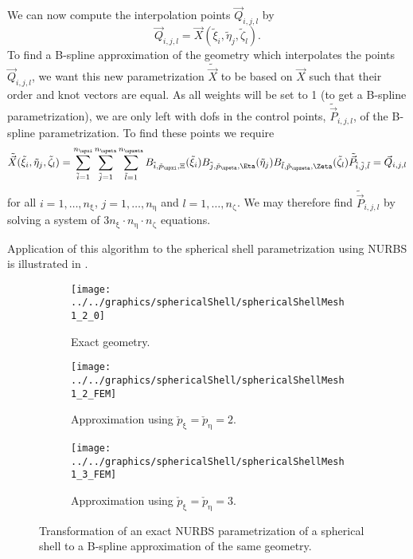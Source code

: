 We can now compute the interpolation points $\vec{Q}_{i,j,l}$ by
\begin{equation}
	\vec{Q}_{i,j,l} = \vec{X}(\tilde{\xi}_i,\tilde{\eta}_j,\tilde{\zeta}_l).
\end{equation}
To find a B-spline approximation of the geometry which interpolates the points $\vec{Q}_{i,j,l}$, we want this new parametrization $\tilde{\vec{X}}$ to be based on $\vec{X}$ such that their order and knot vectors are equal. As all weights will be set to 1 (to get a B-spline parametrization), we are only left with dofs in the control points, $\tilde{\vec{P}}_{i,j,l}$, of the B-spline parametrization. To find these points we require
\begin{equation}
	\tilde{\vec{X}}(\tilde{\xi}_i,\tilde{\eta}_j,\tilde{\zeta}_l) = \sum_{\tilde{i}=1}^{n_\upxi}\sum_{\tilde{j}=1}^{n_\upeta}\sum_{\tilde{l}=1}^{n_\upzeta} B_{\tilde{i},\check{p}_\upxi,\Xi}(\tilde{\xi}_i)B_{\tilde{j},\check{p}_\upeta,\Eta}(\tilde{\eta}_j)B_{\tilde{l},\check{p}_\upzeta,\Zeta}(\tilde{\zeta}_l)\tilde{\vec{P}}_{\tilde{i},\tilde{j},\tilde{l}} = \vec{Q}_{i,j,l}
\end{equation}
for all $i=1,\dots,n_\upxi$, $j=1,\dots,n_\upeta$ and $l=1,\dots,n_\upzeta$. We may therefore find $\tilde{\vec{P}}_{i,j,l}$ by solving a system of $3n_\upxi\cdot n_\upeta\cdot n_\upzeta$ equations.

Application of this algorithm to the spherical shell parametrization using NURBS is illustrated in .
\begin{figure}
	\centering        
	\begin{subfigure}[t]{0.26\textwidth}
		\centering
		\texttt{[image: ../../graphics/sphericalShell/sphericalShellMesh1\_2\_0]}
		\caption{Exact geometry.}
	\end{subfigure}%
	\hspace*{0.11\textwidth}%
	\begin{subfigure}[t]{0.26\textwidth}
		\centering
		\texttt{[image: ../../graphics/sphericalShell/sphericalShellMesh1\_2\_FEM]}
		\caption{Approximation using $\check{p}_\upxi=\check{p}_\upeta=2$.}
	\end{subfigure}%
	\hspace*{0.11\textwidth}%
	\begin{subfigure}[t]{0.26\textwidth}
		\centering
		\texttt{[image: ../../graphics/sphericalShell/sphericalShellMesh1\_3\_FEM]}
		\caption{Approximation using $\check{p}_\upxi=\check{p}_\upeta=3$.}
	\end{subfigure}
	\caption{Transformation of an exact NURBS parametrization of a spherical shell to a B-spline approximation of the same geometry.}
	\label{Fig2:NURBStoBsplineTransVis}
\end{figure}
